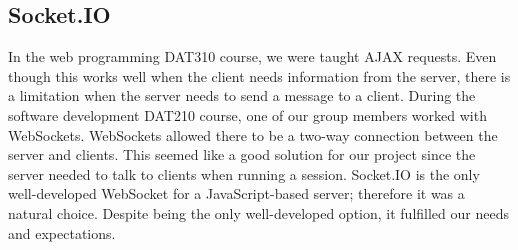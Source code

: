 \subsection{Socket.IO}
In the web programming DAT310 course, we were taught AJAX requests. Even though this works well when the client needs information from the server, there is a limitation when the server needs to send a message to a client. During the software development DAT210 course, one of our group members worked with WebSockets. WebSockets allowed there to be a two-way connection between the server and clients. This seemed like a good solution for our project since the server needed to talk to clients when running a session. Socket.IO is the only well-developed WebSocket for a JavaScript-based server; therefore it was a natural choice. Despite being the only well-developed option, it fulfilled our needs and expectations.

